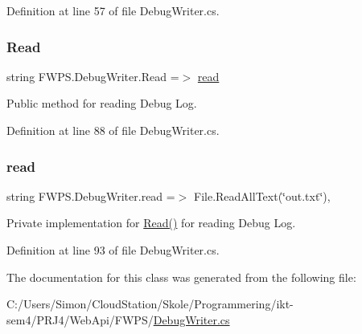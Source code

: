 Definition at line 57 of file Debug\+Writer.\+cs.

\mbox{\label{class_f_w_p_s_1_1_debug_writer_a9d0c7fb6aaf43aaadda1a0a2b3780e57}} 
\subsubsection{\texorpdfstring{Read}{Read}}
{\footnotesize\ttfamily string F\+W\+P\+S.\+Debug\+Writer.\+Read =$>$ \mbox{\hyperlink{class_f_w_p_s_1_1_debug_writer_a75b93784e256da1f4af6fa8ca66227d0}{read}}}



Public method for reading Debug Log. 



Definition at line 88 of file Debug\+Writer.\+cs.

\mbox{\label{class_f_w_p_s_1_1_debug_writer_a75b93784e256da1f4af6fa8ca66227d0}} 
\subsubsection{\texorpdfstring{read}{read}}
{\footnotesize\ttfamily string F\+W\+P\+S.\+Debug\+Writer.\+read =$>$ File.\+Read\+All\+Text(\char`\"{}out.\+txt\char`\"{})\hspace{0.3cm}{\ttfamily [static]}, {\ttfamily [private]}}



Private implementation for \mbox{\hyperlink{class_f_w_p_s_1_1_debug_writer_a9d0c7fb6aaf43aaadda1a0a2b3780e57}{Read()}} for reading Debug Log. 



Definition at line 93 of file Debug\+Writer.\+cs.



The documentation for this class was generated from the following file\+:\begin{DoxyCompactItemize}
\item 
C\+:/\+Users/\+Simon/\+Cloud\+Station/\+Skole/\+Programmering/ikt-\/sem4/\+P\+R\+J4/\+Web\+Api/\+F\+W\+P\+S/\mbox{\hyperlink{_debug_writer_8cs}{Debug\+Writer.\+cs}}\end{DoxyCompactItemize}
